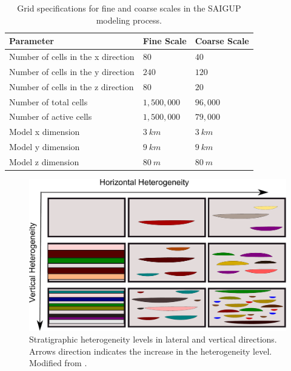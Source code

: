 \begin{table}[tbp]
  \centering
  \caption{Grid specifications for fine and coarse scales in the SAIGUP modeling process.}
  \label{tab:grids}
  \small
  \medskip\renewcommand{\arraystretch}{1.2}
  \begin{tabular}{|p{.35\linewidth}|p{.15\linewidth}|p{.15\linewidth}|}
    \hline
    Parameter &  Fine Scale& Coarse Scale\\ \hline
    Number of cells in the x direction & $80$&$40$\\%
    Number of cells in the y direction & $240$&$120$\\%
    Number of cells in the z direction & $80$&$20$\\%
    Number of total cells & $1,500,000$&$96,000$\\%
    Number of active cells& $1,500,000$&$79,000$\\%
	Model x dimension& $3~km$&$3~km$\\%
	Model y dimension& $9~km$&$9~km$\\%
	Model z dimension& $80~m$&$80~m$\\%
    \hline
  \end{tabular}\renewcommand{\arraystretch}{1}
\end{table}

\begin{figure}
\centering
\includegraphics[width=\linewidth]{./figurer/stratMatrix}
\caption{Stratigraphic heterogeneity levels in lateral and vertical directions. Arrows direction indicates the increase in the heterogeneity level. Modified from \cite{manzocchi2008sensitivity}.}
\label{fig:stratMat}
\end{figure}


